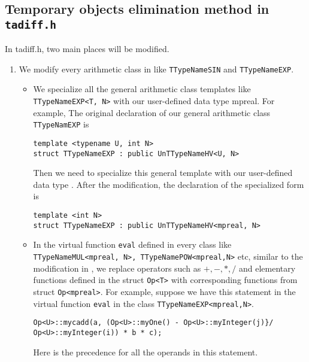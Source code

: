 \subsection{Temporary objects elimination method in \textbf\texttt{tadiff.h}}
In tadiff.h, two main places will be modified.
\begin{enumerate}
	\item  We modify every arithmetic class in \tadiff like {\tt TTypeNameSIN} and {\tt TTypeNameEXP}.
	\begin{itemize}
		\item We specialize all the general arithmetic class templates like {\tt TTypeNameEXP<T, N>} with our user-defined data type mpreal. For example, The original declaration of our general arithmetic  class {\tt TTypeNamEXP} is
\begin{lstlisting}[numbers=none]
template <typename U, int N>
struct TTypeNameEXP : public UnTTypeNameHV<U, N>
\end{lstlisting}
		Then we need to specialize this general template with our user-defined data type \mpreal. After the modification, the declaration of the specialized form is
\begin{lstlisting}[numbers=none]
template <int N>
struct TTypeNameEXP : public UnTTypeNameHV<mpreal, N>
\end{lstlisting}
		\item In the virtual function \texttt{eval} defined in every class like \texttt{TTypeNameMUL<mpreal, N>, TTypeNamePOW<mpreal,N>} etc, similar to the modification in \fadiff, we replace operators such as $+, -, *, /$ and elementary functions defined in the struct \texttt{Op<T>} with corresponding functions from struct \texttt{Op<mpreal>}. For example, suppose we have this statement in the virtual function {\tt eval} in the class \texttt{TTypeNameEXP<mpreal,N>}.
\begin{lstlisting}[numbers=none]
Op<U>::mycadd(a, (Op<U>::myOne() - Op<U>::myInteger(j)}/ Op<U>::myInteger(i)) * b * c);
\end{lstlisting}
	Here is the precedence for all the operands in this statement.
	\begin{itemize}
	

\end{itemize}
\end{itemize}
\end{enumerate}
